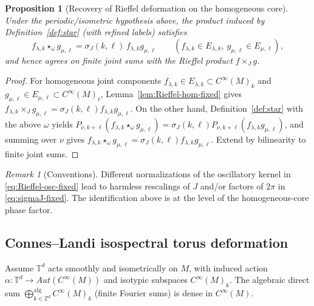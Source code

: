 \documentclass[11pt]{amsart}
\theoremstyle{plain}
\newtheorem{proposition}[theorem]{Proposition}
\theoremstyle{definition}
\theoremstyle{remark}
\newtheorem{remark}[theorem]{Remark}
\newcommand{\bbZ}{\mathbb{Z}}
\newcommand{\bbT}{\mathbb{T}}
\newcommand{\Aut}{Aut}
\begin{document}
\begin{proposition}[Recovery of Rieffel deformation on the homogeneous core]\label{prop:recover-Rieffel-fixed}
Under the periodic/isometric hypothesis above, the product induced by Definition~\ref{def:star} (with refined labels) satisfies
\[
f_{\lambda,k}\star_\omega g_{\mu,\ell}=\sigma_J(k,\ell)\,f_{\lambda,k}g_{\mu,\ell}
\qquad (f_{\lambda,k}\in E_{\lambda,k},\ g_{\mu,\ell}\in E_{\mu,\ell}),
\]
and hence agrees on finite joint sums with the Rieffel product $f\times_J g$.
\end{proposition}

\begin{proof}
For homogeneous joint components $f_{\lambda,k}\in E_{\lambda,k}\subset C^\infty(M)_k$ and $g_{\mu,\ell}\in E_{\mu,\ell}\subset C^\infty(M)_\ell$,
Lemma~\ref{lem:Rieffel-hom-fixed} gives $f_{\lambda,k}\times_J g_{\mu,\ell}=\sigma_J(k,\ell)f_{\lambda,k}g_{\mu,\ell}$.
On the other hand, Definition~\ref{def:star} with the above $\omega$ yields
$P_{\nu,k+\ell}(f_{\lambda,k}\star_\omega g_{\mu,\ell})=\sigma_J(k,\ell)P_{\nu,k+\ell}(f_{\lambda,k}g_{\mu,\ell})$,
and summing over $\nu$ gives $f_{\lambda,k}\star_\omega g_{\mu,\ell}=\sigma_J(k,\ell)f_{\lambda,k}g_{\mu,\ell}$.
Extend by bilinearity to finite joint sums.
\end{proof}

\begin{remark}[Conventions]
Different normalizations of the oscillatory kernel in \eqref{eq:Rieffel-osc-fixed} lead to harmless rescalings of $J$ and/or factors of $2\pi$
in \eqref{eq:sigmaJ-fixed}. The identification above is at the level of the homogeneous-core phase factor.
\end{remark}

\subsection{Connes--Landi isospectral torus deformation}\label{subsec:CL}

Assume $\bbT^d$ acts smoothly and isometrically on $M$, with induced action $\alpha:\bbT^d\to\Aut(C^\infty(M))$ and isotypic subspaces $C^\infty(M)_k$.
The algebraic direct sum $\bigoplus_{k\in\bbZ^d}^{\mathrm{alg}}C^\infty(M)_k$ (finite Fourier sums) is dense in $C^\infty(M)$.
\end{document}
